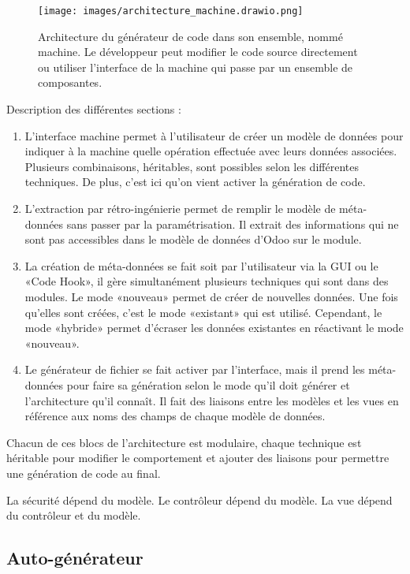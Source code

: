 \begin{figure}
\centering
\texttt{[image: images/architecture\_machine.drawio.png]}
\caption{Architecture du générateur de code dans son ensemble, nommé machine. Le développeur peut modifier le code source directement ou utiliser l'interface de la machine qui passe par un ensemble de composantes.}
\label{fig:dia_architecture}
\end{figure}

Description des différentes sections : 
\begin{enumerate}
    \item L’interface machine permet à l’utilisateur de créer un modèle de données pour indiquer à la machine quelle opération effectuée avec leurs données associées. Plusieurs combinaisons, héritables, sont possibles selon les différentes techniques. De plus, c’est ici qu’on vient activer la génération de code.
    \item L’extraction par rétro-ingénierie permet de remplir le modèle de méta-données sans passer par la paramétrisation. Il extrait des informations qui ne sont pas accessibles dans le modèle de données d’Odoo sur le module.
    \item La création de méta-données se fait soit par l’utilisateur via la GUI ou le «Code Hook», il gère simultanément plusieurs techniques qui sont dans des modules. Le mode «nouveau» permet de créer de nouvelles données. Une fois qu’elles sont créées, c’est le mode «existant» qui est utilisé. Cependant, le mode «hybride» permet d’écraser les données existantes en réactivant le mode «nouveau».
    \item Le générateur de fichier se fait activer par l’interface, mais il prend les méta-données pour faire sa génération selon le mode qu’il doit générer et l’architecture qu’il connaît. Il fait des liaisons entre les modèles et les vues en référence aux noms des champs de chaque modèle de données.
\end{enumerate}

Chacun de ces blocs de l’architecture est modulaire, chaque technique est héritable pour modifier le comportement et ajouter des liaisons pour permettre une génération de code au final.

La sécurité dépend du modèle. Le contrôleur dépend du modèle. La vue dépend du contrôleur et du modèle.

\subsection{Auto-générateur}


